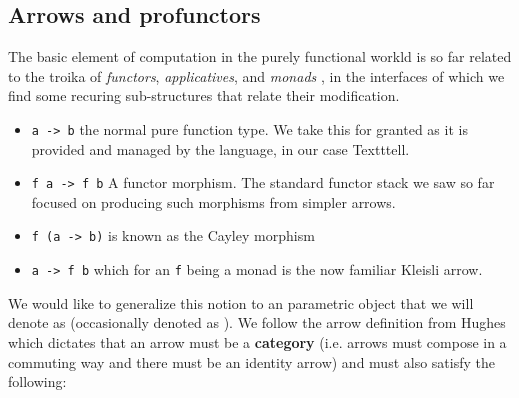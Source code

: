 \subsection{Arrows and profunctors}

The basic element of computation in the purely functional workld is so
far related to the troika of \emph{functors}, \emph{applicatives}, and
\emph{monads} \cite{yorgeyTypeclassopedia2009}, in the interfaces of
which we find some recuring sub-structures that relate their
modification.

\begin{itemize}
\item \texttt{a -> b} the normal pure function type. We take this for granted as
it is provided and managed by the language, in our case Textttell.
\item \texttt{f a -> f b} A functor morphism. The standard functor stack we saw
so far focused on producing such morphisms from simpler arrows.
\item \texttt{f (a -> b)} is known as the Cayley morphism
\item \texttt{a -> f b} which for an \texttt{f} being a monad is the now familiar
Kleisli arrow.
\end{itemize}

We would like to generalize this notion to an parametric object that
we will denote as \hask{~>} (occasionally denoted as  ). We
follow the arrow definition from Hughes
\cite{hughesProgrammingArrows2005} which dictates that an arrow must
be a \textbf{category} (i.e. arrows must compose in a commuting way
and there must be an identity arrow) and must also satisfy the
following:

